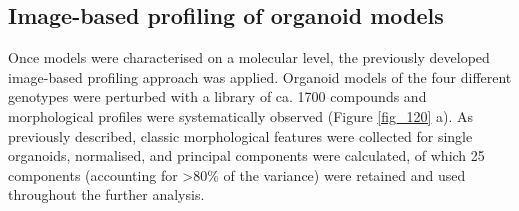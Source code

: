 \begin{flushleft}
\clearpage
\newpage
\section{Image-based profiling of organoid models}

Once models were characterised on a molecular level, the previously developed image-based profiling approach was applied. Organoid models of the four different genotypes were perturbed with a library of ca. 1700 compounds and morphological profiles were systematically observed (Figure \ref{fig_120} a). As previously described, classic morphological features were collected for single organoids, normalised, and principal components were calculated, of which 25 components (accounting for >80\% of the variance) were retained and used throughout the further analysis. 


\end{flushleft}
